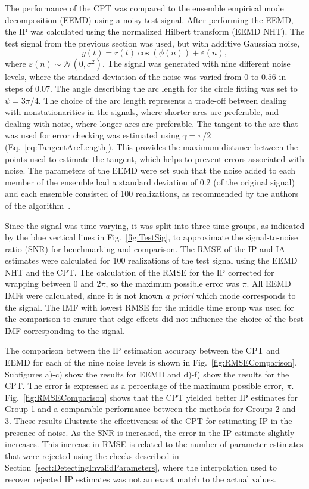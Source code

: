\documentclass[11pt,draftcls,onecolumn]{IEEEtran}
\begin{document}
The performance of the CPT was compared to the ensemble empirical mode decomposition (EEMD) using a noisy test signal. After performing the EEMD, the IP was calculated using the normalized Hilbert transform (EEMD NHT). The test signal from the previous section was used, but with additive Gaussian noise,
\begin{equation}
    y(t)=r\left(t\right)\cos\left(\phi\left(n\right)\right) + \varepsilon \left( n \right),
\end{equation}
where $\varepsilon(n) \sim \mathcal{N}(0,\sigma^2)$. The signal was generated with nine different noise levels, where the standard deviation of the noise was varied from $0$ to $0.56$ in steps of $0.07$. The angle describing the arc length for the circle fitting was set to $\psi=3\pi/4$. The choice of the arc length represents a trade-off between dealing with nonstationarities in the signals, where shorter arcs are preferable, and dealing with noise, where longer arcs are preferable. The tangent to the arc that was used for error checking was estimated using $\gamma = \pi/2$ (Eq.~\ref{eq:TangentArcLength}). This provides the maximum distance between the points used to estimate the tangent, which helps to prevent errors associated with noise. The parameters of the EEMD were set such that the noise added to each member of the ensemble had a standard deviation of 0.2 (of the original signal) and each ensemble consisted of 100 realizations, as recommended by the authors of the algorithm~\cite{Wu2009}. 

Since the signal was time-varying, it was split into three time groups, as indicated by the blue vertical lines in Fig.~\ref{fig:TestSig}, to approximate the signal-to-noise ratio (SNR) for benchmarking and comparison. The RMSE of the IP and IA estimates were calculated for 100 realizations of the test signal using the EEMD NHT and the CPT. The calculation of the RMSE for the IP corrected for wrapping between $0$ and $2\pi$, so the maximum possible error was $\pi$. All EEMD IMFs were calculated, since it is not known \emph{a priori} which mode corresponds to the signal. The IMF with lowest RMSE for the middle time group was used for the comparison to ensure that edge effects did not influence the choice of the best IMF corresponding to the signal. 

The comparison between the IP estimation accuracy between the CPT and EEMD for each of the nine noise levels is shown in Fig.~\ref{fig:RMSEComparison}. Subfigures a)-c) show the results for EEMD and d)-f) show the results for the CPT. The error is expressed as a percentage of the maximum possible error, $\pi$. Fig.~\ref{fig:RMSEComparison} shows that the CPT yielded better IP estimates for Group 1 and a comparable performance between the methods for Groups 2 and 3. These results illustrate the effectiveness of the CPT for estimating IP in the presence of noise. As the SNR is increased, the error in the IP estimate slightly increases. This increase in RMSE is related to the number of parameter estimates that were rejected using the checks described in Section~\ref{sect:DetectingInvalidParameters}, where the interpolation used to recover rejected IP estimates was not an exact match to the actual values.
\end{document}
